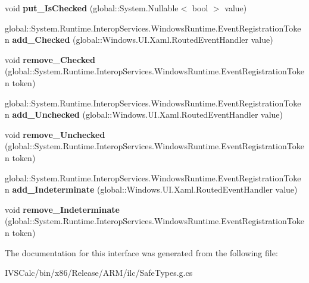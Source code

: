 \begin{DoxyCompactItemize}
void {\bfseries put\+\_\+\+Is\+Checked} (global\+::\+System.\+Nullable$<$ bool $>$ value)
\item 
\mbox{\label{interface_windows_1_1_u_i_1_1_xaml_1_1_controls_1_1_primitives_1_1_i_toggle_button_a9579b9435c7ea6041a3d25d96e4e02b6}} 
global\+::\+System.\+Runtime.\+Interop\+Services.\+Windows\+Runtime.\+Event\+Registration\+Token {\bfseries add\+\_\+\+Checked} (global\+::\+Windows.\+U\+I.\+Xaml.\+Routed\+Event\+Handler value)
\item 
\mbox{\label{interface_windows_1_1_u_i_1_1_xaml_1_1_controls_1_1_primitives_1_1_i_toggle_button_afa5ff3c678236b48b302c60a17489ad3}} 
void {\bfseries remove\+\_\+\+Checked} (global\+::\+System.\+Runtime.\+Interop\+Services.\+Windows\+Runtime.\+Event\+Registration\+Token token)
\item 
\mbox{\label{interface_windows_1_1_u_i_1_1_xaml_1_1_controls_1_1_primitives_1_1_i_toggle_button_af2a52e0a9086bccd03127ee7044692ab}} 
global\+::\+System.\+Runtime.\+Interop\+Services.\+Windows\+Runtime.\+Event\+Registration\+Token {\bfseries add\+\_\+\+Unchecked} (global\+::\+Windows.\+U\+I.\+Xaml.\+Routed\+Event\+Handler value)
\item 
\mbox{\label{interface_windows_1_1_u_i_1_1_xaml_1_1_controls_1_1_primitives_1_1_i_toggle_button_a4828a2c0dc3818cf5b0a8b6f35fbd268}} 
void {\bfseries remove\+\_\+\+Unchecked} (global\+::\+System.\+Runtime.\+Interop\+Services.\+Windows\+Runtime.\+Event\+Registration\+Token token)
\item 
\mbox{\label{interface_windows_1_1_u_i_1_1_xaml_1_1_controls_1_1_primitives_1_1_i_toggle_button_aa819460ff16c0555139f41a6ff334a9b}} 
global\+::\+System.\+Runtime.\+Interop\+Services.\+Windows\+Runtime.\+Event\+Registration\+Token {\bfseries add\+\_\+\+Indeterminate} (global\+::\+Windows.\+U\+I.\+Xaml.\+Routed\+Event\+Handler value)
\item 
\mbox{\label{interface_windows_1_1_u_i_1_1_xaml_1_1_controls_1_1_primitives_1_1_i_toggle_button_ab448af06ccc5e4eaca742a2ef9c88b2b}} 
void {\bfseries remove\+\_\+\+Indeterminate} (global\+::\+System.\+Runtime.\+Interop\+Services.\+Windows\+Runtime.\+Event\+Registration\+Token token)
\end{DoxyCompactItemize}


The documentation for this interface was generated from the following file\+:\begin{DoxyCompactItemize}
\item 
I\+V\+S\+Calc/bin/x86/\+Release/\+A\+R\+M/ilc/Safe\+Types.\+g.\+cs\end{DoxyCompactItemize}
